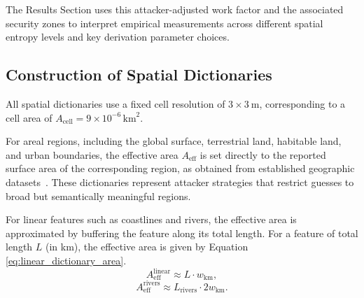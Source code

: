 \documentclass[mathematics,article,accept,pdftex,moreauthors]{Definitions/mdpi}
\begin{document}
The Results Section uses this attacker-adjusted work factor and the associated security zones to interpret empirical measurements across different spatial entropy levels and key derivation parameter choices.

\subsection{Construction of Spatial Dictionaries}

All spatial dictionaries use a fixed cell resolution of $3\times3~\text{m}$, corresponding to a cell area of $A_{\text{cell}} = 9 \times 10^{-6}\,\text{km}^2$.

For areal regions, including the global surface, terrestrial land, habitable land, and urban boundaries, the effective area $A_{\text{eff}}$ is set directly to the reported surface area of the corresponding region, as obtained from established geographic datasets~\cite{FAO_GLC,Venter2016}. These dictionaries represent attacker strategies that restrict guesses to broad but semantically meaningful regions.

For linear features such as coastlines and rivers, the effective area is approximated by buffering the feature along its total length. For a feature of total length $L$ (in km), the effective area is given by Equation \eqref{eq:linear_dictionary_area}.
\begin{equation}
A_{\text{eff}}^{\text{linear}} \approx L \cdot w_{\text{km}},
\label{eq:linear_dictionary_area}
\end{equation}
\begin{equation}
A_{\text{eff}}^{\text{rivers}} \approx L_{\text{rivers}} \cdot 2 w_{\text{km}}.
\label{eq:river_dictionary_area}
\end{equation}
\end{document}

